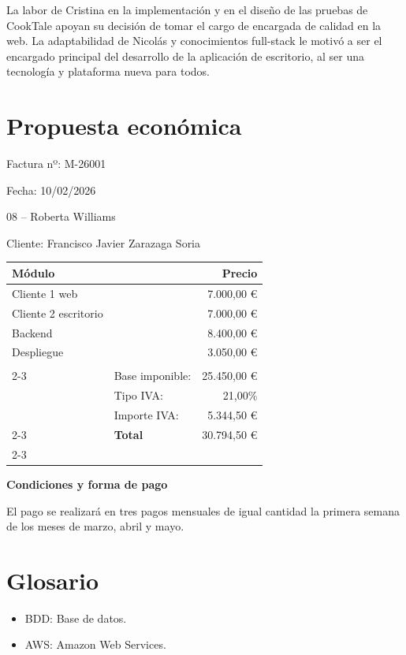 \documentclass[11pt]{article}
\begin{document}
La labor de Cristina en la implementación y en el diseño de las pruebas de 
CookTale apoyan su decisión de tomar el cargo de encargada de calidad en la
web. La adaptabilidad de Nicolás y conocimientos full-stack le motivó a ser 
el encargado principal del desarrollo de la aplicación de escritorio, 
al ser una tecnología y plataforma nueva para todos.

\newpage

\section{Propuesta económica}
\label{sec:propuesta}
\hfill{Factura nº: M-26001}

\hfill{Fecha: 10/02/2026}

08 -- Roberta Williams

Cliente: Francisco Javier Zarazaga Soria

\begin{tabularx}{\textwidth}{Xlr}
\hline
		\textbf{Módulo} & & \textbf{Precio} \\
		\hline
		Cliente 1 web & & 7.000,00 €\\
		Cliente 2 escritorio & & 7.000,00 €\\
		Backend & & 8.400,00 € \\ 
		Despliegue & & 3.050,00 € \\ 
		\hline 
		& & \\ \cline{2-3}

		& Base imponible: & 25.450,00 € \\ 
		& Tipo IVA: & 21,00\% \\ 
		& Importe IVA: & 5.344,50 € \\ 
	 \cline{2-3}
		& \textbf{Total} & 30.794,50 € \\ 
	 \cline{2-3}
\end{tabularx}

\textbf{Condiciones y forma de pago}

El pago se realizará en tres pagos mensuales de igual cantidad la primera semana de los meses de marzo, abril y mayo.

\newpage

\thispagestyle{empty}
\nocite{*}
\printbibliography

\newpage

\appendix

\section{Glosario}
\label{sec:glosario}
\begin{itemize}
		\item BDD: Base de datos.
		\item AWS: Amazon Web Services.
\end{itemize}
\end{document}
